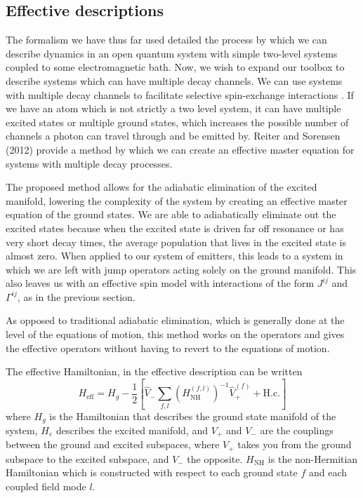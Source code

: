 \documentclass{article}
\begin{document}
\subsection{Effective descriptions}
The formalism we have thus far used detailed the process by which we can describe
dynamics in an open quantum system with simple two-level systems coupled to some
electromagnetic bath. 
Now, we wish to expand our toolbox to describe systems which can
have multiple decay channels. We can use systems with multiple decay channels to
facilitate selective spin-exchange interactions \cite{periwal_programmable_2021}.
If we have an atom which is not strictly a two level system, it can
have multiple excited states or multiple ground states, which increases the possible
number of channels a photon can travel through and be emitted by. Reiter and Sorensen
(2012) \cite{reiter_effective_2012} provide a method by which we can create an effective
master equation for systems with multiple decay processes.

The proposed method allows for the adiabatic elimination of the excited manifold,
lowering the complexity of the system by creating an effective master equation of the
ground states. We are able to adiabatically eliminate out the excited states because
when the excited state is driven far off resonance or has very short decay times, the
average population that lives in the excited state is almost zero. When applied to our
system of emitters, this leads to a system in which we are left with jump operators
acting solely on the ground manifold. This also leaves us with an effective spin model
with interactions of the form $J^{ij}$ and $\Gamma^{ij}$, as in the previous section.

As opposed to traditional adiabatic elimination, which is generally done at the level
of the equations of motion, this method works on the operators and gives the effective
operators without having to revert to the equations of motion.

The effective Hamiltonian, in the effective description can be written
\begin{equation}
  H_{\mathrm{eff}} = H_g - \frac{1}{2}\left[ \hat{V}_- \sum_{f,l}
  \left(H_{\mathrm{NH}}^{(f,l)}\right)^{-1}\hat{V}_+^{(f)} + \mathrm{H.c.} \right]
\end{equation}
where $H_g$ is the Hamiltonian that describes the ground state manifold of the system,
$H_e$ describes the excited manifold, and $V_+$ and $V_-$ are the couplings between
the ground and excited subspaces, where $V_+$ takes you from the ground subspace to
the excited subspace, and $V_-$ the opposite. $H_{\mathrm{NH}}$ is the non-Hermitian
Hamiltonian which is constructed with respect to each ground state $f$ and each
coupled field mode $l$.
\end{document}
